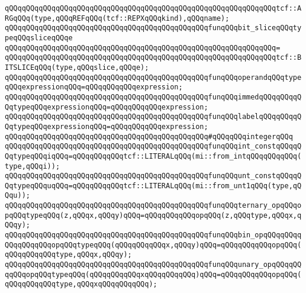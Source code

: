 \verb|qQQqqQQqqQQqqQQqqQQqqQQqqQQqqQQqqQQqqQQqqQQqqQQqqQQqqQQqqQQqqQQqtcf::ARGqQQq(type,qQQqREFqQQq(tcf::REPXqQQqkind),qQQqname);|\newline
\newline
\verb|qQQqqQQqqQQqqQQqqQQqqQQqqQQqqQQqqQQqqQQqqQQqqQQqfunqQQqbit_sliceqQQqtypeqQQqsliceqQQqe|\newline
\verb|qQQqqQQqqQQqqQQqqQQqqQQqqQQqqQQqqQQqqQQqqQQqqQQqqQQqqQQqqQQqqQQq=|\newline
\verb|qQQqqQQqqQQqqQQqqQQqqQQqqQQqqQQqqQQqqQQqqQQqqQQqqQQqqQQqqQQqqQQqtcf::BITSLICEqQQq(type,qQQqslice,qQQqe);|\newline
\newline
\verb|qQQqqQQqqQQqqQQqqQQqqQQqqQQqqQQqqQQqqQQqqQQqqQQqfunqQQqoperandqQQqtypeqQQqexpressionqQQq=qQQqqQQqqQQqexpression;|\newline
\verb|qQQqqQQqqQQqqQQqqQQqqQQqqQQqqQQqqQQqqQQqqQQqqQQqfunqQQqimmedqQQqqQQqqQQqtypeqQQqexpressionqQQq=qQQqqQQqqQQqexpression;|\newline
\verb|qQQqqQQqqQQqqQQqqQQqqQQqqQQqqQQqqQQqqQQqqQQqqQQqfunqQQqlabelqQQqqQQqqQQqtypeqQQqexpressionqQQq=qQQqqQQqqQQqexpression;|\newline
\newline
\verb|qQQqqQQqqQQqqQQqqQQqqQQqqQQqqQQqqQQqqQQqqQQqqQQq#qQQqqQQqintegerqQQq|\newline
\newline
\verb|qQQqqQQqqQQqqQQqqQQqqQQqqQQqqQQqqQQqqQQqqQQqqQQqfunqQQqint_constqQQqqQQqtypeqQQqiqQQq=qQQqqQQqqQQqtcf::LITERALqQQq(mi::from_intqQQqqQQqqQQq(type,qQQqi));|\newline
\verb|qQQqqQQqqQQqqQQqqQQqqQQqqQQqqQQqqQQqqQQqqQQqqQQqfunqQQqunt_constqQQqqQQqtypeqQQquqQQq=qQQqqQQqqQQqtcf::LITERALqQQq(mi::from_unt1qQQq(type,qQQqu));|\newline
\newline
\verb|qQQqqQQqqQQqqQQqqQQqqQQqqQQqqQQqqQQqqQQqqQQqqQQqfunqQQqternary_opqQQqopqQQqtypeqQQq(z,qQQqx,qQQqy)qQQq=qQQqqQQqqQQqopqQQq(z,qQQqtype,qQQqx,qQQqy);|\newline
\verb|qQQqqQQqqQQqqQQqqQQqqQQqqQQqqQQqqQQqqQQqqQQqqQQqfunqQQqbin_opqQQqqQQqqQQqqQQqqQQqopqQQqtypeqQQq(qQQqqQQqqQQqx,qQQqy)qQQq=qQQqqQQqqQQqopqQQq(qQQqqQQqqQQqtype,qQQqx,qQQqy);|\newline
\verb|qQQqqQQqqQQqqQQqqQQqqQQqqQQqqQQqqQQqqQQqqQQqqQQqfunqQQqunary_opqQQqqQQqqQQqopqQQqtypeqQQq(qQQqqQQqqQQqxqQQqqQQqqQQq)qQQq=qQQqqQQqqQQqopqQQq(qQQqqQQqqQQqtype,qQQqxqQQqqQQqqQQq);|\newline
\newline

